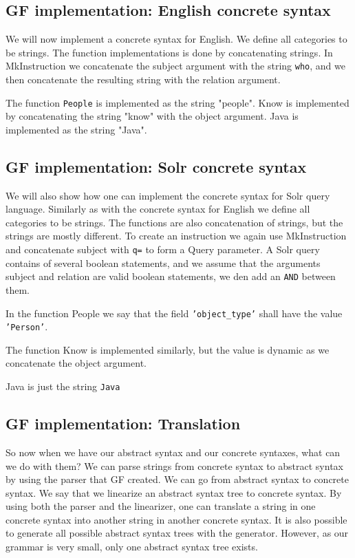 \documentclass[
10pt, %
a4paper, %
oneside, %
headinclude,footinclude, %
BCOR5mm, %
]{scrartcl}
\begin{document}
\subsection{GF implementation: English concrete syntax}
We will now implement a concrete syntax for English. We define all categories to be strings. The function implementations is done by concatenating strings. In MkInstruction we concatenate the subject argument with the string \texttt{who}, and we then concatenate the resulting string with the relation argument.

The function \texttt{People} is implemented as the string "people". Know is implemented by concatenating the string "know" with the object argument. Java is implemented as the string "Java".

\subsection{GF implementation: Solr concrete syntax}
We will also show how one can implement the concrete syntax for Solr query language. Similarly as with the concrete syntax for English we define all categories to be strings.
\newline
\newline
The functions are also concatenation of strings, but the strings are mostly different. To create an instruction we again use MkInstruction and concatenate subject with \texttt{q=} to form a Query parameter. A Solr query contains of several boolean statements, and we assume that the arguments subject and relation are valid boolean statements, we den add an \texttt{AND} between them.

In the function People we say that the field \texttt{'object\_type'} shall have the value \texttt{'Person'}. 

The function Know is implemented similarly, but the value is dynamic as we concatenate the object argument.

Java is just the string \texttt{Java}

\subsection{GF implementation: Translation}
So now when we have our abstract syntax and our concrete syntaxes, what can we do with them?
\newline
\newline
We can parse strings from concrete syntax to abstract syntax by using the parser that GF created.
\newline
\newline
We can go from abstract syntax to concrete syntax. We say that we linearize an abstract syntax tree to concrete syntax. By using both the parser and the linearizer, one can translate a string in one concrete syntax into another string in another concrete syntax.
\newline
\newline
It is also possible to generate all possible abstract syntax trees with the generator. However, as our grammar is very small, only one abstract syntax tree exists.
\end{document}
